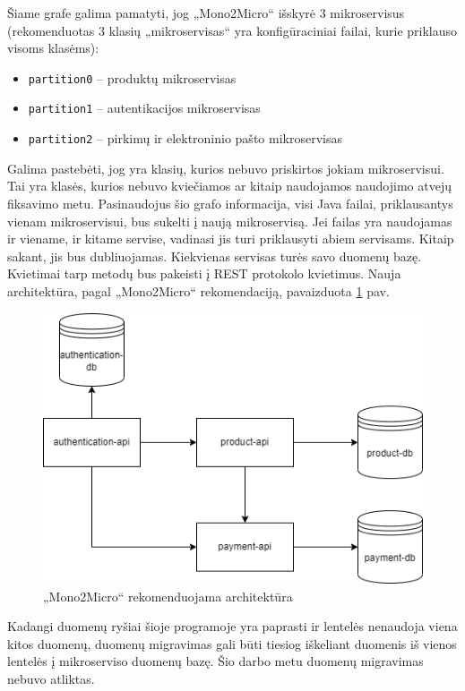 \documentclass{VUMIFPSbakalaurinis}
\begin{document}
Šiame grafe galima pamatyti, jog „Mono2Micro“ išskyrė 3 mikroservisus (rekomenduotas 3 klasių „mikroservisas“ yra konfigūraciniai failai, kurie priklauso visoms klasėms):
\begin{itemize}
    \item \verb|partition0| -- produktų mikroservisas

    \item \verb|partition1| -- autentikacijos mikroservisas

    \item \verb|partition2| -- pirkimų ir elektroninio pašto mikroservisas
\end{itemize}

Galima pastebėti, jog yra klasių, kurios nebuvo priskirtos jokiam mikroservisui. Tai yra klasės, kurios nebuvo kviečiamos ar kitaip naudojamos naudojimo atvejų fiksavimo metu. Pasinaudojus šio grafo informacija, visi Java failai, priklausantys vienam mikroservisui, bus sukelti į naują mikroservisą. Jei failas yra naudojamas ir viename, ir kitame servise, vadinasi jis turi priklausyti abiem servisams. Kitaip sakant, jis bus dubliuojamas. Kiekvienas servisas turės savo duomenų bazę. Kvietimai tarp metodų bus pakeisti į REST protokolo kvietimus. Nauja architektūra, pagal „Mono2Micro“ rekomendaciją, pavaizduota \ref{img:nauja-architektura} pav. 

\begin{figure}[H]
    \centering
    \includegraphics[scale=0.6]{img/microservices-new.png}
    \caption{„Mono2Micro“ rekomenduojama architektūra}
    \label{img:nauja-architektura}
\end{figure}

Kadangi duomenų ryšiai šioje programoje yra paprasti ir lentelės nenaudoja viena kitos duomenų, duomenų migravimas gali būti tiesiog iškeliant duomenis iš vienos lentelės į mikroserviso duomenų bazę. Šio darbo metu duomenų migravimas nebuvo atliktas.
\end{document}
